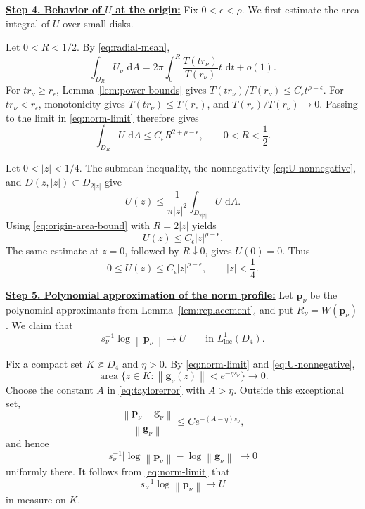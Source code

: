 \documentclass[12pt,letterpaper,reqno]{amsart}
\theoremstyle{definition}
\numberwithin{equation}{section}
\newcommand{\dd}{\,\mathrm d}
\newcommand{\dA}{\,\mathrm dA}
\newcommand{\loc}{\mathrm{loc}}
\newcommand{\norm}[1]{\left\lVert#1\right\rVert}
\DeclareMathOperator{\meas}{area}
\newcommand{\gv}{\bm g}
\newcommand{\pv}{\bm p}
\begin{document}
\medskip\noindent
\textbf{\underline{Step 4. Behavior of \(U\) at the origin:}}
Fix \(0<\epsilon<\rho\). We first estimate the area integral of \(U\)
over small disks.

Let \(0<R<1/2\). By \eqref{eq:radial-mean},
\[
\int_{D_R}U_\nu\,\dA
=
2\pi
\int_0^R
\frac{T(tr_\nu)}{T(r_\nu)}t\,\dd t
+
o(1).
\]
For \(tr_\nu\geq r_\epsilon\),
Lemma~\ref{lem:power-bounds} gives
\(T(tr_\nu)/T(r_\nu)\leq
C_\epsilon t^{\rho-\epsilon}\).
For \(tr_\nu<r_\epsilon\), monotonicity gives
\(T(tr_\nu)\leq T(r_\epsilon)\), and
\(T(r_\epsilon)/T(r_\nu)\to0\).
Passing to the limit in \eqref{eq:norm-limit} therefore gives
\begin{equation}\label{eq:origin-area-bound}
 \int_{D_R}U\,\dA
 \leq
 C_\epsilon R^{2+\rho-\epsilon},
 \qquad
 0<R<\frac12.
\end{equation}

Let \(0<|z|<1/4\). The submean inequality, the nonnegativity
\eqref{eq:U-nonnegative}, and
\(D(z,|z|)\subset D_{2|z|}\) give
\[
U(z)
\leq
\frac1{\pi|z|^2}
\int_{D_{2|z|}}U\,\dA.
\]
Using \eqref{eq:origin-area-bound} with \(R=2|z|\) yields
\[
U(z)\leq C_\epsilon|z|^{\rho-\epsilon}.
\]
The same estimate at \(z=0\), followed by \(R\downarrow0\), gives
\(U(0)=0\). Thus
\begin{equation}\label{eq:origin-bound}
 0\leq
 U(z)
 \leq
 C_\epsilon|z|^{\rho-\epsilon},
 \qquad
 |z|<\frac14.
\end{equation}


\medskip\noindent
\textbf{\underline{Step 5. Polynomial approximation of the norm profile:}}
Let \(\pv_\nu\) be the polynomial approximants from
Lemma~\ref{lem:replacement}, and put
\(R_\nu=W(\pv_\nu)\).
We claim that
\begin{equation}\label{eq:polynomial-norm}
 s_\nu^{-1}\log\norm{\pv_\nu}
 \longrightarrow U
 \qquad\text{in }L^1_{\loc}(D_4).
\end{equation}

Fix a compact set \(K\Subset D_4\) and \(\eta>0\). By
\eqref{eq:norm-limit} and \eqref{eq:U-nonnegative},
\[
\meas\{
z\in K:\norm{\gv_\nu(z)}<e^{-\eta s_\nu}
\}
\longrightarrow0.
\]
Choose the constant \(A\) in \eqref{eq:taylorerror} with \(A>\eta\).
Outside this exceptional set,
\[
\frac{\norm{\pv_\nu-\gv_\nu}}
     {\norm{\gv_\nu}}
\leq
C e^{-(A-\eta)s_\nu},
\]
and hence
\[
s_\nu^{-1}
 \bigl|\log\norm{\pv_\nu}-\log\norm{\gv_\nu}\bigr|\longrightarrow0
\]
uniformly there. It follows from \eqref{eq:norm-limit} that
\[
s_\nu^{-1}\log\norm{\pv_\nu}\longrightarrow U
\]
in measure on \(K\).
\end{document}
